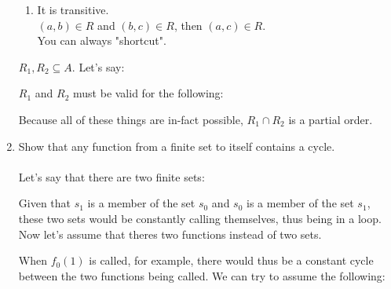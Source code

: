 \documentclass[letterpaper,11pt]{article}
\newcommand{\notimplies}{%
  \mathrel{{\ooalign{\hidewidth$\not\phantom{=}$\hidewidth\cr$\implies$}}}}
\begin{document}
\begin{enumerate}
\begin{enumerate}
		    \item It is transitive.\\
		    $(a,b)\in R$ and $(b,c)\in R$, then $(a,c)\in R$.\\
		    You can always "shortcut".
		\end{enumerate}
		
		$R_1, R_2 \subseteq A$. Let's say:
		
		$R_1$ and $R_2$ must be valid for the following:
		
		Because all of these things are in-fact possible, $R_1\cap R_2$ is a partial order.
		\newpage
		\item Show that any function from a finite set to itself contains a cycle.\\\\
		Let's say that there are two finite sets:
		Given that $s_1$ is a member of the set $s_0$ and $s_0$ is a member of the set $s_1$, these two sets would be constantly calling themselves, thus being in a loop. Now let's assume that theres two functions instead of two sets.
		
		When $f_0(1)$ is called, for example, there would thus be a constant cycle between the two functions being called. We can try to assume the following:
		

\end{enumerate}
\end{document}
